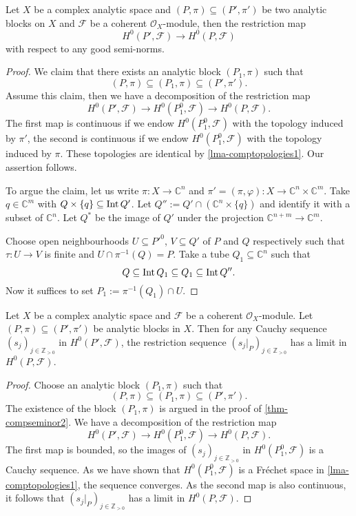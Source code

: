 \begin{thm}\label{thm-compseminor2}
    Let $X$ be a complex analytic space and $(P,\pi)\subseteq (P',\pi')$ be two analytic blocks on $X$ and $\mathcal{F}$ be a coherent $\mathcal{O}_X$-module, then the restriction map
    \[
        H^0(P',\mathcal{F}) \rightarrow H^0(P,\mathcal{F}) 
    \]
    with respect to any good semi-norms.
\end{thm}
\begin{proof}
    We claim that there exists an analytic block $(P_1,\pi)$ such that
    \[
        (P,\pi)\subseteq (P_1,\pi)\subseteq (P',\pi').  
    \]
    Assume this claim, then we have a decomposition of the restriction map
    \[
        H^0(P',\mathcal{F}) \rightarrow H^0(P_1^0,\mathcal{F})\rightarrow H^0(P,\mathcal{F}).
    \]
    The first map is continuous if we endow $H^0(P_1^0,\mathcal{F})$ with the topology induced by $\pi'$, the second is continuous if we endow $H^0(P_1^0,\mathcal{F})$ with the topology induced by $\pi$. These topologies are identical by \cref{lma-comptopologies1}.
    Our assertion follows.

    To argue the claim, let us write $\pi:X\rightarrow \mathbb{C}^n$ and $\pi'=(\pi,\varphi):X\rightarrow \mathbb{C}^n\times \mathbb{C}^m$. Take $q\in \mathbb{C}^m$ with $Q\times\{q\}\subseteq \operatorname{Int} Q'$. Let $Q'':=Q'\cap (\mathbb{C}^n\times \{q\})$ and identify it with a subset of $\mathbb{C}^n$. Let $Q^*$ be the image of $Q'$ under the projection $\mathbb{C}^{n+m}\rightarrow \mathbb{C}^m$. 

    Choose open neighbourhoods $U\subseteq P'^0$, $V\subseteq Q'$ of $P$ and $Q$ respectively such that $\tau:U\rightarrow V$ is finite and $U\cap \pi^{-1}(Q)=P$. Take a tube $Q_1\subseteq \mathbb{C}^n$ such that
    \[
        Q\subseteq \operatorname{Int} Q_1\subseteq Q_1\subseteq \operatorname{Int} Q''.  
    \]
    Now it suffices to set $P_1:=\pi^{-1}(Q_1)\cap U$.
\end{proof}

\begin{corollary}\label{cor-convthm}
    Let $X$ be a complex analytic space and $\mathcal{F}$ be a coherent $\mathcal{O}_X$-module. Let
    $(P,\pi)\subseteq (P',\pi')$ be analytic blocks in $X$. Then for any Cauchy sequence $(s_j)_{j\in \mathbb{Z}_{>0}}$ in $H^0(P',\mathcal{F})$, the restriction sequence $(s_j|_P)_{j\in \mathbb{Z}_{>0}}$ has a limit in $H^0(P,\mathcal{F})$.
\end{corollary}
\begin{proof}
    Choose an analytic block $(P_1,\pi)$ such that
    \[
        (P,\pi)\subseteq (P_1,\pi)\subseteq (P',\pi').  
    \]
    The existence of the block $(P_1,\pi)$ is argued in the proof of \cref{thm-compseminor2}. We have a decomposition of the restriction map
    \[
        H^0(P',\mathcal{F}) \rightarrow H^0(P_1^0,\mathcal{F})\rightarrow H^0(P,\mathcal{F}).
    \]
    The first map is bounded, so the images of $(s_j)_{j\in \mathbb{Z}_{>0}}$ in $H^0(P_1^0,\mathcal{F})$ is a Cauchy sequence. As we have shown that $H^0(P_1^0,\mathcal{F})$ is a Fréchet space in \cref{lma-comptopologies1}, the sequence converges. As the second map is also continuous, it follows that $(s_j|_P)_{j\in \mathbb{Z}_{>0}}$ has a limit in $H^0(P,\mathcal{F})$.
\end{proof}

